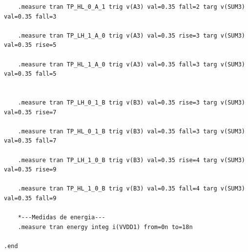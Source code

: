\documentclass[ecp,tc, english]{iiufrgs}
\begin{document}
\begin{lstlisting}
    .measure tran TP_HL_0_A_1 trig v(A3) val=0.35 fall=2 targ v(SUM3) val=0.35 fall=3

    .measure tran TP_LH_1_A_0 trig v(A3) val=0.35 rise=3 targ v(SUM3) val=0.35 rise=5

    .measure tran TP_HL_1_A_0 trig v(A3) val=0.35 fall=3 targ v(SUM3) val=0.35 fall=5


    .measure tran TP_LH_0_1_B trig v(B3) val=0.35 rise=3 targ v(SUM3) val=0.35 rise=7

    .measure tran TP_HL_0_1_B trig v(B3) val=0.35 fall=3 targ v(SUM3) val=0.35 fall=7

    .measure tran TP_LH_1_0_B trig v(B3) val=0.35 rise=4 targ v(SUM3) val=0.35 rise=9

    .measure tran TP_HL_1_0_B trig v(B3) val=0.35 fall=4 targ v(SUM3) val=0.35 fall=9   
    
    *---Medidas de energia---
    .measure tran energy integ i(VVDD1) from=0n to=18n
    
.end
\end{lstlisting}


\end{document}
